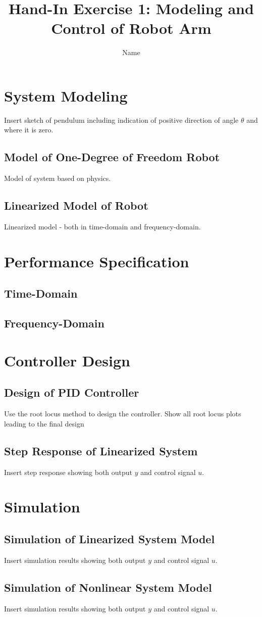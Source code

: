 \documentclass[a4paper,10pt,oneside]{article}
\begin{document}
\title{Hand-In Exercise 1: Modeling and Control of Robot Arm}
\author{Name}

\section{System Modeling}
Insert sketch of pendulum including indication of positive direction of angle $\theta$ and where it is zero.
\subsection{Model of One-Degree of Freedom Robot}
Model of system based on physics.
\subsection{Linearized Model of Robot}
Linearized model - both in time-domain and frequency-domain.
\section{Performance Specification}
\subsection{Time-Domain}

\subsection{Frequency-Domain}

\section{Controller Design}

\subsection{Design of PID Controller}
Use the root locus method to design the controller. Show all root locus plots leading to the final design
\subsection{Step Response of Linearized System}
Insert step response showing both output $y$ and control signal $u$.
\section{Simulation}
\subsection{Simulation of Linearized System Model}
Insert simulation results showing both output $y$ and control signal $u$.
\subsection{Simulation of Nonlinear System Model}
Insert simulation results showing both output $y$ and control signal $u$.
\end{document}
